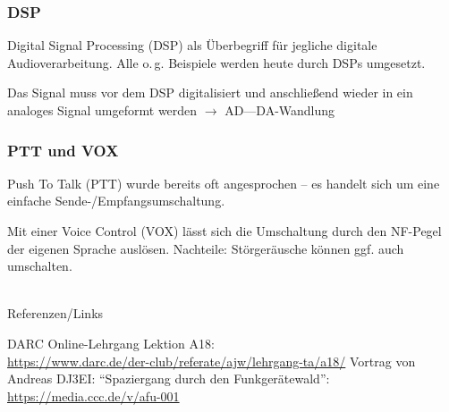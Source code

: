 \begin{frame}
  \frametitle{DSP}

  Digital Signal Processing (DSP) als Überbegriff für jegliche digitale
  Audioverarbeitung. Alle o.\,g. Beispiele werden heute durch DSPs umgesetzt.

  \bigskip

  Das Signal muss vor dem DSP digitalisiert und anschließend wieder in ein
  analoges Signal umgeformt werden $\rightarrow$ AD---DA-Wandlung

\end{frame}

\begin{frame}
  \frametitle{PTT und VOX}

  Push To Talk (PTT) wurde bereits oft angesprochen -- es handelt sich um eine
  einfache Sende-/Empfangsumschaltung.

  \bigskip

  Mit einer Voice Control (VOX) lässt sich die Umschaltung durch den NF-Pegel
  der eigenen Sprache auslösen. Nachteile: Störgeräusche können ggf. auch
  umschalten.

\end{frame}

\renewcommand{\refname}{Referenzen}

\hypertarget{refs}{}
\textcolor{white}{} \\ %
\Large Referenzen/Links
\footnotesize

\begin{thebibliography}{}
    DARC Online-Lehrgang Lektion A18:\\
    \url{https://www.darc.de/der-club/referate/ajw/lehrgang-ta/a18/}
   Vortrag von Andreas DJ3EI: ``Spaziergang durch den Funkgerätewald'':\\
    \url{https://media.ccc.de/v/afu-001}
\end{thebibliography}



